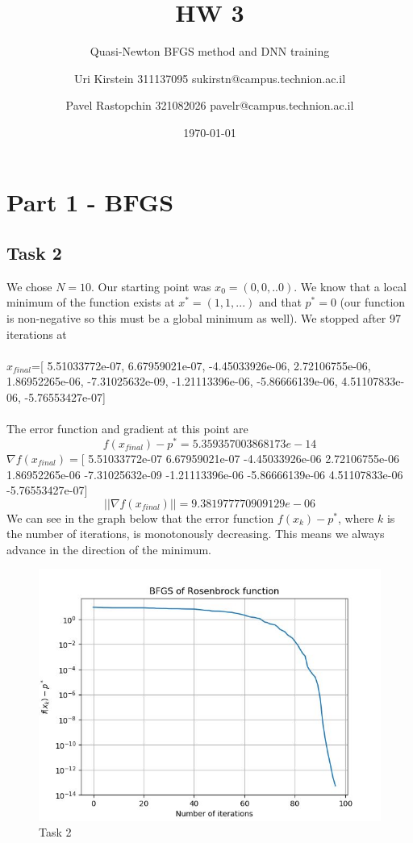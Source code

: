 \documentclass[12pt]{scrartcl}
\begin{document}

\titlehead{CS department, Technion}
\subject{Introduction to Optimization and Deep Learning 236330}
\title{HW 3}
\subtitle{Quasi-Newton BFGS method and DNN training}
\author{Uri Kirstein 311137095 \hfill sukirstn@campus.technion.ac.il\and Pavel Rastopchin 321082026 pavelr@campus.technion.ac.il}
\date{\today}
\maketitle

\section*{Part 1 - BFGS}
\subsection*{Task 2}
We chose $N=10$. Our starting point was $x_0=(0,0,..0)$. We know that a local minimum of the function exists at $x^*=(1,1,...)$ and that $p^*=0$ (our function is non-negative so this must be a global minimum as well). We stopped after 97 iterations at\\\\
$x_{final}$=[ 5.51033772e-07,  6.67959021e-07, -4.45033926e-06, 
2.72106755e-06, 1.86952265e-06, -7.31025632e-09, -1.21113396e-06, -5.86666139e-06, 4.51107833e-06, -5.76553427e-07]\\\\
The error function and gradient at this point are $$f(x_{final})-p^*=5.359357003868173e-14$$
$\nabla f(x_{final})=$[ 5.51033772e-07  6.67959021e-07 -4.45033926e-06  2.72106755e-06\\
  1.86952265e-06 -7.31025632e-09 -1.21113396e-06 -5.86666139e-06
  4.51107833e-06\\ -5.76553427e-07]
$$||\nabla f(x_{final})|| = 9.381977770909129e-06$$
We can see in the graph below that the error function $f(x_k)-p^*$, where $k$ is the number of iterations, is monotonously decreasing. This means we always advance in the direction of the minimum.
\begin{figure}[h!]
	\hfill\includegraphics[width=\linewidth]{rosenbrock_graph.jpg}\hspace*{\fill}
	\caption{Task 2}
\end{figure}
\end{document}
